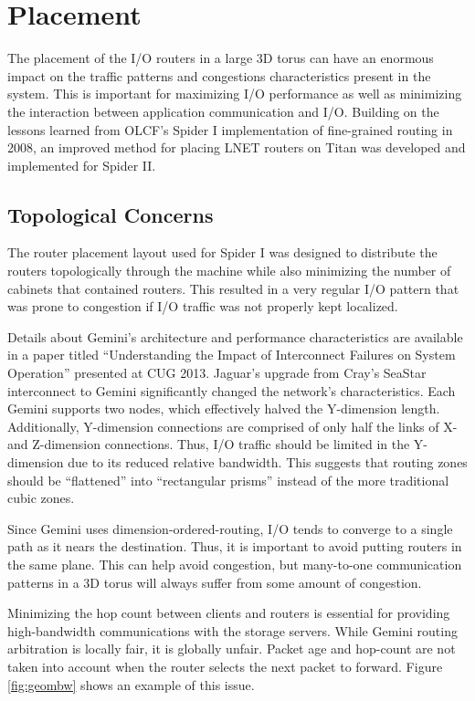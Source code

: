\section{Placement}

The placement of the I/O routers in a large 3D torus can have an enormous impact
on the traffic patterns and congestions characteristics present in the system.
This is important for maximizing I/O performance as well as minimizing the
interaction between application communication and I/O. Building on the lessons
learned from OLCF's Spider I implementation of fine-grained routing in 2008, an
improved method for placing LNET routers on Titan was developed and implemented
for Spider II.

\subsection{Topological Concerns}

The router placement layout used for Spider I was designed to distribute the
routers topologically through the machine while also minimizing the number of
cabinets that contained routers. This resulted in a very regular I/O pattern
that was prone to congestion if I/O traffic was not properly kept localized.

Details about Gemini's architecture and performance characteristics are
available in a paper titled ``Understanding the Impact of Interconnect Failures
on System Operation'' \cite{interconnect} presented at CUG 2013.  Jaguar's
upgrade from Cray's SeaStar interconnect to Gemini significantly changed the
network's characteristics.  Each Gemini supports two nodes, which effectively
halved the Y-dimension length.  Additionally, Y-dimension connections are
comprised of only half the links of X- and Z-dimension connections.  Thus, I/O
traffic should be limited in the Y-dimension due to its reduced relative
bandwidth.  This suggests that routing zones should be ``flattened'' into
``rectangular prisms'' instead of the more traditional cubic zones.

Since Gemini uses dimension-ordered-routing, I/O tends to converge to a single
path as it nears the destination.  Thus, it is important to avoid putting
routers in the same plane.  This can help avoid congestion, but many-to-one
communication patterns in a 3D torus will always suffer from some amount of
congestion.

Minimizing the hop count between clients and routers is essential for providing
high-bandwidth communications with the storage servers.  While Gemini routing
arbitration is locally fair, it is globally unfair.  Packet age and hop-count
are not taken into account when the router selects the next packet to forward.
Figure \ref{fig:geombw} shows an example of this issue.

